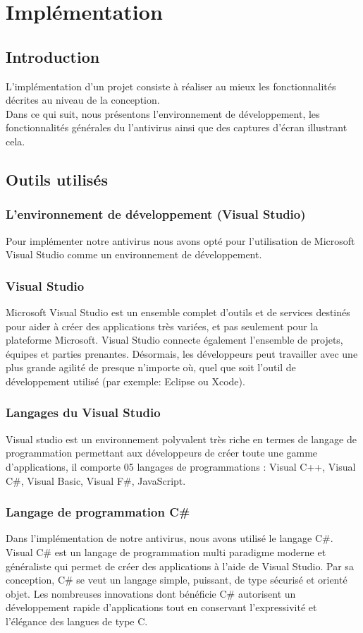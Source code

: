\chapter{Implémentation}
\section{Introduction}

L'implémentation d'un projet consiste à réaliser au mieux les fonctionnalités décrites au niveau de la conception.\\

Dans ce qui suit, nous présentons l'environnement de développement, les fonctionnalités générales du l'antivirus ainsi que des captures d'écran illustrant cela.


\section{Outils utilisés}
\subsection{L'environnement de développement (Visual Studio) }
Pour implémenter notre antivirus nous avons opté pour l'utilisation de Microsoft Visual Studio comme un environnement de développement.
\subsection{Visual Studio}
Microsoft Visual Studio est un ensemble complet d'outils et de services destinés pour aider à créer des applications très variées, et pas seulement pour la plateforme Microsoft. Visual Studio connecte également l'ensemble de projets, équipes et parties prenantes. Désormais, les développeurs peut travailler avec une plus grande agilité de presque n'importe où, quel que soit l'outil de développement utilisé (par exemple: Eclipse ou Xcode). 
\subsection{Langages du Visual Studio}
Visual studio est un environnement polyvalent très riche en termes de langage de programmation permettant aux développeurs de créer toute une gamme d'applications, il comporte 05 langages de programmations : Visual C++, Visual C\#, Visual Basic, Visual F\#, JavaScript. 
\subsection{Langage de programmation C\# }
Dans l'implémentation de notre antivirus, nous avons utilisé le langage C\#. Visual C\# est un langage de programmation multi paradigme moderne et généraliste qui permet de créer des applications à l'aide de Visual Studio. Par sa conception, C\# se veut un langage simple, puissant, de type sécurisé et orienté objet. Les nombreuses innovations dont bénéficie C\# autorisent un développement rapide d'applications tout en conservant l'expressivité et l'élégance des langues de type C.

